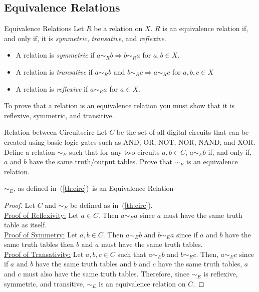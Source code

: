 \subsection{Equivalence Relations}
\begin{definition}{Equivalence Relations}{}
    Let $R$ be a relation on $X$. $R$ is an equivalence relation if, and only if, it is \textit{symmetric}, \textit{transative}, and \textit{reflexive}.
    \begin{itemize}
        \item A relation is \textit{symmetric} if $a \sim_R b \Rightarrow b \sim_R a$ for $a, b \in X$.
        \item A relation is \textit{transative} if $a \sim_R b$ and $b \sim_R c \Rightarrow a \sim_R c$ for $a, b, c \in X$
        \item A relation is \textit{reflexive} if $a \sim_R a$ for $a \in X$.
    \end{itemize}
    To prove that a relation is an equivalence relation you must show that it is reflexive, symmetric, and transitive.
\end{definition}

\begin{question}{Relation between Circuits}{circ}
    Let $C$ be the set of all digital circuits that can be created using basic logic gates such as AND, OR, NOT, NOR, NAND, and XOR. Define a relation $\sim_E$  such that for any two circuits $a, b \in C$, $a \sim_E b$ if, and only if, $a$ and $b$ have the same truth/output tables. Prove that $\sim_E$ is an equivalence relation.
\end{question}

\begin{tcolorbox}[colback=pink]
\begin{theorem}
    $\sim_E$, as defined in~(\ref{th:circ})~is an Equivalence Relation
\end{theorem}
\begin{proof}
    Let $C$ and $\sim_E$ be defined as in~(\ref{th:circ}). \\
    \hspace*{2em}\underline{Proof of Reflexivity:} Let $a \in C$. Then $a \sim_E a$ since $a$ must have the same truth table as itself. \\
    \hspace*{2em}\underline{Proof of Symmetry:} Let $a, b \in C$. Then $a \sim_E b$ and $b \sim_E a$ since if $a$ and $b$ have the same truth tables then $b$ and $a$ must have the same truth tables. \\
    \hspace*{2em}\underline{Proof of Transativity:} Let $a, b, c \in C$ such that $a \sim_E b$ and $b \sim_E c$. Then, $a \sim_E c$ since if $a$ and $b$ have the same truth tables and $b$ and $c$ have the same truth tables, $a$ and $c$ must also have the same truth tables.
    Therefore, since $\sim_E$ is reflexive, symmetric, and transitive, $\sim_E$ is an equivalence relation on $C$.
\end{proof}
\end{tcolorbox}

